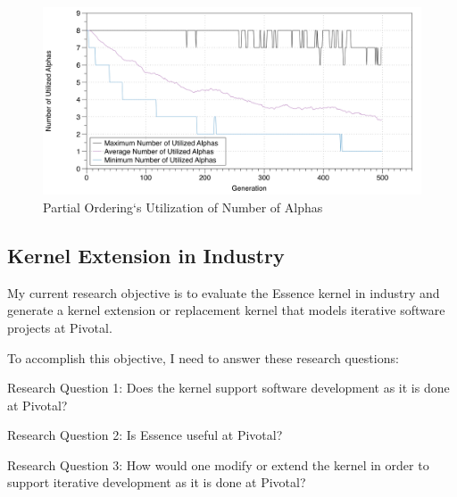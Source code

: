 \documentclass[preprint,12pt,3p]{elsarticle}
\begin{document}
\begin{figure}[ht]\vspace*{4pt}
\centerline{\includegraphics[width=5.00in]{genetic_programming/number_of_alphas_partial_ordering_500gens_40runs_8alpha}}
\caption{Partial Ordering`s Utilization of Number of Alphas}\vspace*{-6pt}
\label{NumberOfAlphasPartialOrdering}
\end{figure}


\subsection{Kernel Extension in Industry}
\label{PivotalKernelExtension}
My current research objective is to evaluate the Essence kernel in industry and generate a kernel extension or replacement kernel that models iterative software projects at Pivotal.

To accomplish this objective, I need to answer these research questions:

Research Question 1: Does the kernel support software development as it is done at Pivotal? 

Research Question 2: Is Essence useful at Pivotal?

Research Question 3: How would one modify or extend the kernel in order to support iterative development as it is done at Pivotal?
\end{document}
